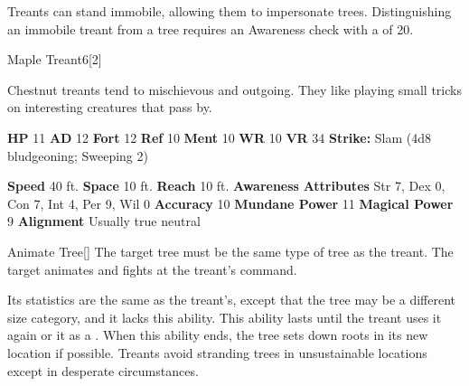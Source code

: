        Treants can stand immobile, allowing them to impersonate trees.
        Distinguishing an immobile treant from a tree requires an Awareness check with a  of 20.
  

  \begin{monsubsection}{Maple Treant}{6}[2]
    \vspace{-1em}\vspace{-1em}
    \vspace{0em}

    
          Chestnut treants tend to mischievous and outgoing.
          They like playing small tricks on interesting creatures that pass by.
        

    \begin{spellcontent}
      \begin{spelltargetinginfo}
        \pari \textbf{HP} 11 \monsep
          \textbf{AD} 12 \monsep
          \textbf{Fort} 12 \monsep
          \textbf{Ref} 10 \monsep
          \textbf{Ment} 10
        \pari \textbf{WR} 10 \monsep
        \textbf{VR} 34
        \pari \textbf{Strike:}
            Slam  (4d8 bludgeoning; Sweeping 2)
      \end{spelltargetinginfo}
    \end{spellcontent}
    \begin{monsterfooter}
      \pari \textbf{Speed} 40 ft. \monsep
        \textbf{Space} 10 ft. \monsep
        \textbf{Reach} 10 ft.
      \pari \textbf{Awareness} 
      \pari \textbf{Attributes}
        Str 7, Dex 0,
        Con 7, Int 4,
        Per 9, Wil 0
      \pari \textbf{Accuracy} 10 \monsep
        \textbf{Mundane Power} 11 \monsep
      \textbf{Magical Power} 9
      \pari \textbf{Alignment} Usually true neutral
    \end{monsterfooter}
  \end{monsubsection}
  \begin{freeability}{Animate Tree}[]
      The target tree must be the same type of tree as the treant.
        The target animates and fights at the treant's command.

        Its statistics are the same as the treant's, except that the tree may be a different size category, and it lacks this ability.
        This ability lasts until the treant uses it again or  it as a .
        When this ability ends, the tree sets down roots in its new location if possible.
        Treants avoid stranding trees in unsustainable locations except in desperate circumstances.
    \end{freeability}
  
